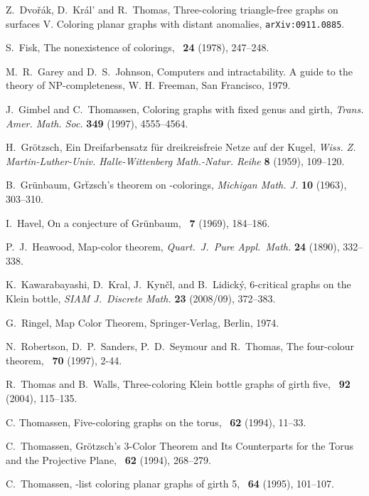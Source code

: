 \documentclass{article}
\begin{document}
\begin{thebibliography}{99}
 Z.~Dvo\v{r}\'ak, D.~Kr\'al' and R.~Thomas,
Three-coloring triangle-free graphs on surfaces V. Coloring planar graphs with distant anomalies,
{\tt arXiv:0911.0885}.

 S.~Fisk, The nonexistence of colorings,
\JCTB\ {\bf 24} (1978), 247--248.

 M.~R.~Garey and D.~S.~Johnson,
Computers and intractability. A guide
to the theory of NP-completeness, W. H. Freeman, San Francisco, 1979.

 J.~Gimbel and C.~Thomassen,
Coloring graphs with fixed genus and girth,
{\em Trans. Amer. Math. Soc.} {\bf 349} (1997), 4555--4564.

 H.~Gr\"otzsch,
Ein Dreifarbensatz f\"ur dreikreisfreie Netze auf der Kugel,
{\em Wiss. Z. Martin-Luther-Univ. Halle-Wittenberg Math.-Natur. Reihe}
{\bf 8} (1959), 109--120.

 B.~Gr\"unbaum,
Gr\"tzsch's theorem on -colorings,
{\it Michigan Math. J.} {\bf 10} (1963), 303--310.

 I.~Havel,
On a conjecture of Gr\"unbaum,
\JCTB\ {\bf 7} (1969), 184--186.

 P.~J.~Heawood, Map-color theorem,
{\it Quart.\ J.~Pure Appl.\ Math.} {\bf 24} (1890), 332--338.

 K.~Kawarabayashi, D.~Kral, J.~Kyn\v{c}l, and B.~Lidick\'y,
6-critical graphs on the Klein bottle,
{\it SIAM J.~Discrete Math.}  {\bf23}  (2008/09), 372--383.

 G.~Ringel, Map Color Theorem,
Springer-Verlag, Berlin, 1974.

N.~Robertson, D.~P.~Sanders, P.~D.~Seymour and R.~Thomas,
The four-colour theorem, \JCTB\ {\bf 70} (1997), 2-44.

 R.~Thomas and B.~Walls,
Three-coloring Klein bottle graphs of girth five,
\JCTB\ {\bf  92}  (2004), 115--135.

 C. Thomassen, Five-coloring graphs on the torus,
\JCTB\ {\bf62} (1994), 11--33.

 C.~Thomassen,
Gr\"otzsch's 3-Color Theorem and Its Counterparts for the Torus and the Projective Plane,
\JCTB\ {\bf 62} (1994), 268--279.

 C.~Thomassen,
-list coloring planar graphs of girth 5,
\JCTB\ {\bf64} (1995), 101--107.


\end{thebibliography}
\end{document}
